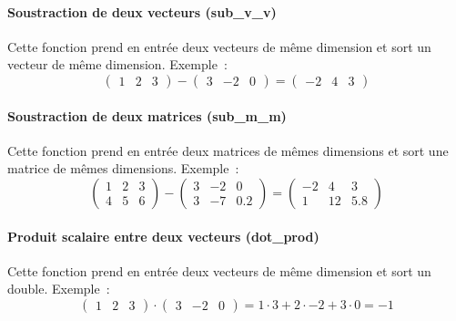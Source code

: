 \documentclass[a4paper, 12pt]{article}
\begin{document}
\paragraph{Soustraction de deux vecteurs (sub\_v\_v)}
Cette fonction prend en entrée deux vecteurs de même dimension et sort un vecteur de même dimension. Exemple~:
\begin{equation*}
      \begin{pmatrix} 1  &  2 & 3 \end{pmatrix}
    - \begin{pmatrix} 3  & -2 & 0 \end{pmatrix}
    = \begin{pmatrix} -2 &  4 & 3 \end{pmatrix}
\end{equation*}

\paragraph{Soustraction de deux matrices (sub\_m\_m)}
Cette fonction prend en entrée deux matrices de mêmes dimensions et sort une matrice de mêmes dimensions. Exemple~:
\begin{equation*}
      \begin{pmatrix} 1  &  2 & 3 \\ 4 &  5 & 6   \end{pmatrix}
    - \begin{pmatrix} 3  & -2 & 0 \\ 3 & -7 & 0.2 \end{pmatrix}
    = \begin{pmatrix} -2 &  4 & 3 \\ 1 & 12 & 5.8 \end{pmatrix}
\end{equation*}

\paragraph{Produit scalaire entre deux vecteurs (dot\_prod)}
Cette fonction prend en entrée deux vecteurs de même dimension et sort un double. Exemple~:
\begin{equation*}
        \begin{pmatrix} 1  &  2 & 3 \end{pmatrix}
  \cdot \begin{pmatrix} 3  & -2 & 0 \end{pmatrix}
  =     1 \cdot 3 + 2 \cdot -2 + 3 \cdot 0 = -1
\end{equation*}
\end{document}
